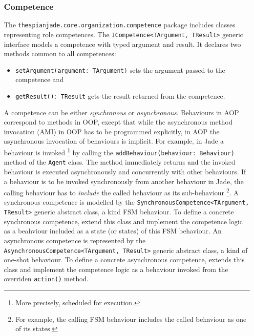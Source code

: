 \subsubsection{Competence}

The \texttt{thespianjade.core.organization.competence} package includes classes representing role competences.
The \texttt{ICompetence<TArgument, TResult>} generic interface models a competence with typed argument and result.
It declares two methods common to all competences:
\begin{itemize}
	\item \texttt{setArgument(argument: TArgument)} sets the argument passed to the competence and
	\item \texttt{getResult(): TResult} gets the result returned from the competence.
\end{itemize}

A competence can be either \textit{synchronous} or \textit{asynchronous}.
Behaviours in AOP correspond to methods in OOP, except that while the asynchronous method invocation (AMI) in OOP has to be programmed explicitly, in AOP the asynchronous invocation of behaviours is implicit.
For example, in Jade a behaviour is invoked
\footnote{More precisely, scheduled for execution.}
by calling the \texttt{addBehaviour(behaviour: Behaviour)} method of the \texttt{Agent} class.
The method immediately returns and the invoked behaviour is executed asynchronously and concurrently with other behaviours.
If a behaviour is to be invoked synchronously from another behaviour in Jade, the calling behaviour has to \textit{include} the called behaviour as its sub-behaviour
\footnote{For example, the calling FSM behaviour includes the called behaviour as one of its states.}.
A synchronous competence is modelled by the \texttt{SynchronousCompetence<TArgument, TResult>} generic abstract class, a kind FSM behaviour.
To define a concrete synchronous competence, extend this class and implement the competence logic as a beahviour included as a state (or states) of this FSM behaviour.
An asynchronous competence is represented by the \texttt{AsynchronousCompetence<TArgument, TResult>} generic abstract class, a kind of one-shot behaviour.
To define a concrete asynchronous competence, extends this class and implement the competence logic as a behaviour invoked from the overriden \texttt{action()} method.

